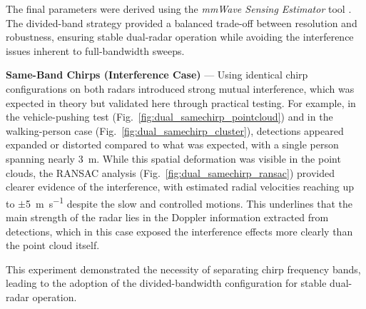 The final parameters were derived using the \textit{mmWave Sensing Estimator} tool \cite{mmwave_demo_output}.  
The divided-band strategy provided a balanced trade-off between resolution and robustness, ensuring stable dual-radar operation while avoiding the interference issues inherent to full-bandwidth sweeps.

\textbf{Same-Band Chirps (Interference Case)} — Using identical chirp configurations on both radars introduced strong mutual interference, which was expected in theory but validated here through practical testing.  
For example, in the vehicle-pushing test (Fig.~\ref{fig:dual_samechirp_pointcloud}) and in the walking-person case (Fig.~\ref{fig:dual_samechirp_cluster}), detections appeared expanded or distorted compared to what was expected, with a single person spanning nearly \SI{3}{\meter}.  
While this spatial deformation was visible in the point clouds, the RANSAC analysis (Fig.~\ref{fig:dual_samechirp_ransac}) provided clearer evidence of the interference, with estimated radial velocities reaching up to $\pm$\SI{5}{\meter\per\second} despite the slow and controlled motions.  
This underlines that the main strength of the radar lies in the Doppler information extracted from detections, which in this case exposed the interference effects more clearly than the point cloud itself.  

This experiment demonstrated the necessity of separating chirp frequency bands, leading to the adoption of the divided-bandwidth configuration for stable dual-radar operation.

